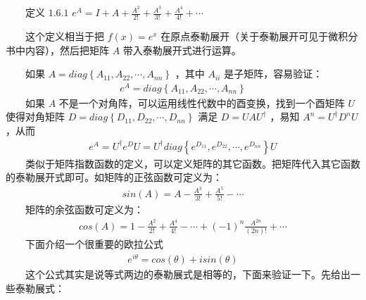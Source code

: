 \documentclass[a4paper,11pt,english]{sphinxmanual}
\begin{document}
\sphinxAtStartPar
​  定义 \(1.6.1\)  \(e^{A}={I+A+\frac{A^{2}}{2!}+\frac{A^{3}}{3!}+\frac{A^{4}}{4!}+ \cdots}\)

\sphinxAtStartPar
​  这个定义相当于把 \(f(x)=e^{x}\) 在原点泰勒展开（关于泰勒展开可见于微积分书中内容），然后把矩阵 \(A\) 带入泰勒展开式进行运算。

\sphinxAtStartPar
​  如果  \(A=diag\left\{A_{11}, A_{22} ,\cdots,A_{nn}\right\}\) ，其中 \(A_{ii}\)  是子矩阵，容易验证：
\begin{equation*}
\begin{split}e^{A}=diag\left\{A_{11}, A_{22} ,\cdots,A_{nn}\right\}\end{split}
\end{equation*}
\sphinxAtStartPar
​  如果 \(A\) 不是一个对角阵，可以运用线性代数中的酉变换，找到一个酉矩阵 \(U\)  使得对角矩阵  \(D=diag\left\{D_{11}, D_{22} ,\cdots,D_{nn}\right\}\)  满足 \(D=U A U^{\dagger}\)  ，易知 \(A^{n}=U^{\dagger} D^{n} U\) ，从而
\begin{equation*}
\begin{split}e^{A}=U^{\dagger} e^{D} U = U^{\dagger}diag\left\{e^{D_{11}}, e^{D_{22}} ,\cdots,e^{D_{nn}}\right\}U\end{split}
\end{equation*}
\sphinxAtStartPar
​  类似于矩阵指数函数的定义，可以定义矩阵的其它函数。把矩阵代入其它函数的泰勒展开式即可。如矩阵的正弦函数可定义为：
\begin{equation*}
\begin{split}sin(A)={A-\frac{A^{3}}{3!}+\frac{A^{5}}{5!}-\cdots}\end{split}
\end{equation*}
\sphinxAtStartPar
​  矩阵的余弦函数可定义为：
\begin{equation*}
\begin{split}cos(A)={1-\frac{A^{2}}{2!}+\frac{A^{4}}{4!}-\cdots+(-1)^{n}\frac{A^{2n}}{(2n)!}+\cdots}\end{split}
\end{equation*}
\sphinxAtStartPar
​  下面介绍一个很重要的欧拉公式
\begin{equation*}
\begin{split}e^{i \theta} =cos(\theta)+isin(\theta)\end{split}
\end{equation*}
\sphinxAtStartPar
​  这个公式其实是说等式两边的泰勒展式是相等的，下面来验证一下。先给出一些泰勒展式：
\end{document}
